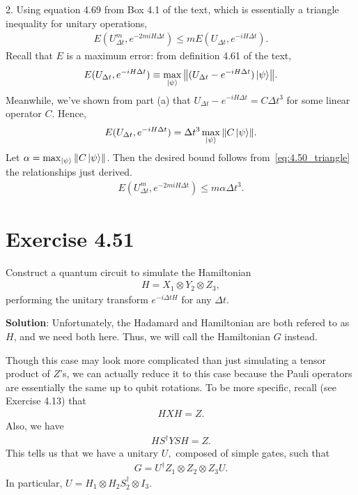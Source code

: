 \documentclass{book}
\begin{document}
    2. Using equation 4.69 from Box 4.1 of the text, which is essentially a triangle inequality for unitary operations,
    \begin{align} \label{eq:4.50_triangle}
        E(U_{\Delta t}^m, e^{-2miH\Delta t}) \leq m E(U_{\Delta t}, e^{-i H \Delta t}).
    \end{align}
    Recall that $E$ is a maximum error: from definition 4.61 of the text,
    \begin{align}
        E(U_{\Delta t}, e^{-i H \Delta t}) \equiv \max_{\ket{\psi}} \norm{(U_{\Delta t} -e^{-i H \Delta t})\ket{\psi}}.
    \end{align}
    Meanwhile, we've shown from part (a) that $U_{\Delta t} -e^{-i H \Delta t} = C \Delta t^3$ for some linear operator $C$. Hence,
    \begin{align}
        E(U_{\Delta t}, e^{-i H \Delta t}) = \Delta t^3 \max_{\ket{\psi}} \norm{C \ket{\psi}}.
    \end{align}
    Let $\alpha = \max_{\ket{\psi}} \norm{C \ket{\psi}}$. Then the desired bound follows from~\eqref{eq:4.50_triangle} the relationships just derived.
    \begin{align}
        E(U_{\Delta t}^m, e^{-2miH\Delta t}) \leq m \alpha \Delta t^3.
    \end{align}

\section*{Exercise 4.51}
    Construct a quantum circuit to simulate the Hamiltonian
    \begin{align}
        H = X_1 \otimes Y_2 \otimes Z_3,
    \end{align}
    performing the unitary transform $e^{-i\Delta t H}$ for any $\Delta t$.

    \textbf{Solution}: Unfortunately, the Hadamard and Hamiltonian are both refered to as $H$, and we need both here. Thus, we will call the Hamiltonian $G$ instead.
    
    Though this case may look more complicated than just simulating a tensor product of $Z$'s, we can actually reduce it to this case because the Pauli operators are essentially the same up to qubit rotations. To be more specific, recall (see Exercise 4.13) that
    \begin{align}
        HXH = Z.
    \end{align}
    Also, we have
    \begin{align}
        H S^\dagger Y S H = Z.
    \end{align}
    This tells us that we have a unitary $U,$ composed of simple gates, such that
    \begin{align}
        G = U^\dagger Z_1\otimes Z_2 \otimes Z_3 U.
    \end{align}
    In particular, $U = H_1 \otimes H_2 S_2^\dagger \otimes I_3$. 
\end{document}

